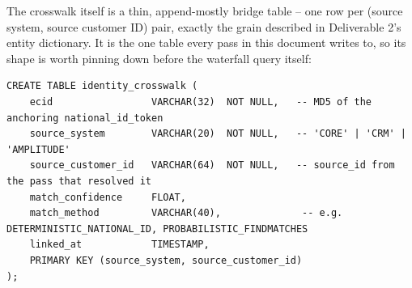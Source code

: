 \documentclass[11pt]{article}
\begin{document}
The crosswalk itself is a thin, append-mostly bridge table -- one row per (source system, source customer ID) pair, exactly the grain described in Deliverable 2's entity dictionary. It is the one table every pass in this document writes to, so its shape is worth pinning down before the waterfall query itself:

\begin{lstlisting}[language=PseudoSQL, style=codeblock]
CREATE TABLE identity_crosswalk (
    ecid                 VARCHAR(32)  NOT NULL,   -- MD5 of the anchoring national_id_token
    source_system        VARCHAR(20)  NOT NULL,   -- 'CORE' | 'CRM' | 'AMPLITUDE'
    source_customer_id   VARCHAR(64)  NOT NULL,   -- source_id from the pass that resolved it
    match_confidence     FLOAT,
    match_method         VARCHAR(40),              -- e.g. DETERMINISTIC_NATIONAL_ID, PROBABILISTIC_FINDMATCHES
    linked_at            TIMESTAMP,
    PRIMARY KEY (source_system, source_customer_id)
);
\end{lstlisting}
\end{document}
